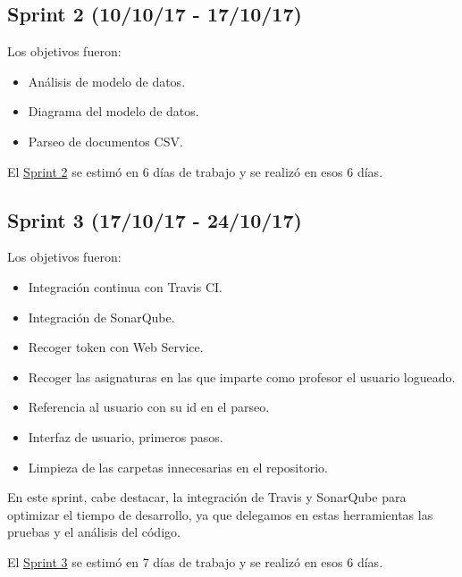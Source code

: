 
\subsection{Sprint 2 (10/10/17 -
	17/10/17)}\label{sprint-2-101017---171017}

Los objetivos fueron:
\begin{itemize}
	\tightlist
	\item
	Análisis de modelo de datos.
	\item
	Diagrama del modelo de datos.
	\item
	Parseo de documentos CSV.	
	
\end{itemize}

El \href{https://github.com/trona85/GII-17.1B-UBULog-1.0/milestone/2?closed=1}{Sprint 2} se estimó en 6 días de trabajo y se realizó en esos 6 días.


\subsection{Sprint 3 (17/10/17 -
	24/10/17)}\label{sprint-3-171017---241017}

Los objetivos fueron:
\begin{itemize}
	\tightlist
	\item
	Integración continua con Travis CI.
	\item
	Integración de  SonarQube.
	\item
	Recoger token con Web Service.	
	\item
	Recoger las asignaturas en las que imparte como profesor el usuario logueado.
	\item
	Referencia al usuario con su id en el parseo.
	\item
	Interfaz de usuario, primeros pasos.
	\item
	Limpieza de las carpetas innecesarias en el repositorio.
	
\end{itemize}

En este sprint, cabe destacar, la integración de Travis\cite{web:travis} y SonarQube \cite{web:sonarqube} para optimizar el tiempo de desarrollo, ya que delegamos en estas herramientas las pruebas y el análisis del código.

El \href{https://github.com/trona85/GII-17.1B-UBULog-1.0/milestone/3?closed=1}{Sprint 3} se estimó en 7 días de trabajo y se realizó en esos 6 días.

